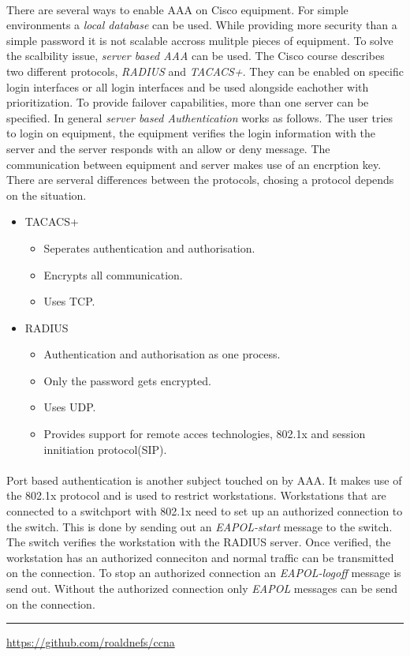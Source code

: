 \documentclass[10pt,landscape]{article}
\begin{document}
\begin{multicols}{3}
\paragraph{}
There are several ways to enable AAA on Cisco equipment. For simple environments a \textit{local database} can be used.
While providing more security than a simple password it is not scalable accross mulitple pieces of equipment. To solve
the scalbility issue, \textit{server based AAA} can be used. The Cisco course describes two different protocols,
\textit{RADIUS} and \textit{TACACS+}. They can be enabled on specific login interfaces or all login interfaces and be
used alongside eachother with prioritization. To provide failover capabilities, more than one server can be specified.
In general \textit{server based Authentication} works as follows. The user tries to login on equipment,
the equipment verifies the login information with the server and the server responds with an allow or deny message.
The communication between equipment and server makes use of an encrption key.
There are serveral differences between the protocols, chosing a protocol depends on the situation.
\begin{itemize}
	\item TACACS+
	\begin{itemize}
		\item Seperates authentication and authorisation.
		\item Encrypts all communication.
		\item Uses TCP.
	\end{itemize}
	\item RADIUS
	\begin{itemize}
		\item Authentication and authorisation as one process.
		\item Only the password gets encrypted.
		\item Uses UDP.
		\item Provides support for remote acces technologies, 802.1x and session innitiation protocol(SIP).
	\end{itemize}
\end{itemize}
\paragraph{}
Port based authentication is another subject touched on by AAA. It makes use of the 802.1x protocol and is used to restrict workstations.
Workstations that are connected to a switchport with 802.1x need to set up an authorized connection to the switch.
This is done by sending out an \textit{EAPOL-start} message to the switch. The switch verifies the workstation with the RADIUS server.
Once verified, the workstation has an authorized conneciton and normal traffic can be transmitted on the connection.
To stop an authorized connection an \textit{EAPOL-logoff} message is send out.
Without the authorized connection only \textit{EAPOL} messages can be send on the connection.


\rule{0.3\linewidth}{0.25pt}
\scriptsize

\href{https://github.com/roaldnefs/ccna}{https://github.com/roaldnefs/ccna}

\end{multicols}
\end{document}
